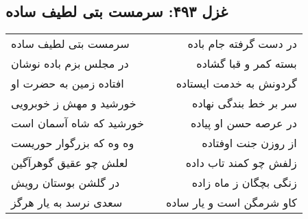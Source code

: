 \begin{center}
\section*{غزل ۴۹۳: سرمست بتی لطیف ساده}
\label{sec:493}
\begin{longtable}{l p{0.5cm} r}
سرمست بتی لطیف ساده
&&
در دست گرفته جام باده
\\
در مجلس بزم باده نوشان
&&
بسته کمر و قبا گشاده
\\
افتاده زمین به حضرت او
&&
گردونش به خدمت ایستاده
\\
خورشید و مهش ز خوبرویی
&&
سر بر خط بندگی نهاده
\\
خورشید که شاه آسمان است
&&
در عرصه حسن او پیاده
\\
وه وه که بزرگوار حوریست
&&
از روزن جنت اوفتاده
\\
لعلش چو عقیق گوهرآگین
&&
زلفش چو کمند تاب داده
\\
در گلشن بوستان رویش
&&
زنگی بچگان ز ماه زاده
\\
سعدی نرسد به یار هرگز
&&
کاو شرمگن است و یار ساده
\\
\end{longtable}
\end{center}

